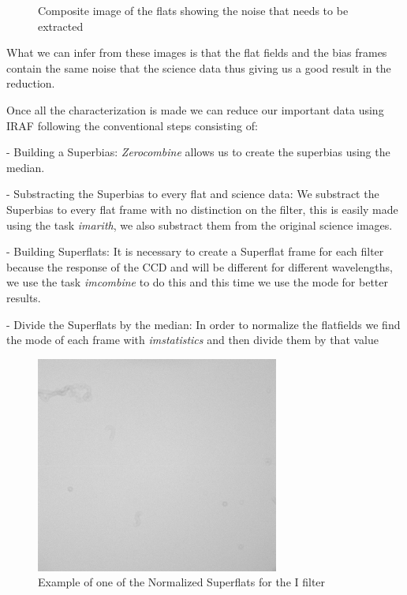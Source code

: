 \begin{figure}[H]
\begin{minipage}[b]{0.47\textwidth}
    \caption[Clean image of NGC5139]{Composite image of the flats showing the noise that needs to be extracted}
  \end{minipage}
\end{figure}

What we can infer from these images is that the flat fields and the bias frames contain the same noise that the science data thus giving us a good result in the reduction.

Once all the characterization is made we can reduce our important data using IRAF following the conventional steps consisting of: 

- Building a Superbias: \textit{Zerocombine} allows us to create the superbias using the median.

- Substracting the Superbias to every flat and science data: We substract the Superbias to every flat frame with no distinction on the filter, this is easily made using the task \textit{imarith}, we also substract them from the original science images.

- Building Superflats: It is necessary to create a Superflat frame for each filter because the response of the CCD and will be different for different wavelengths, we use the task \textit{imcombine} to do this and this time we use the mode for better results.   

- Divide the Superflats by the median: In order to normalize the flatfields we find the mode of each frame with \textit{imstatistics} and then divide them by that value


\begin{figure}[H]
\centering
\includegraphics[width=8cm]{images/flat_I.png}
\caption[Normalized Superflat for the filter I]{Example of one of the Normalized Superflats for the I filter}
\end{figure}

